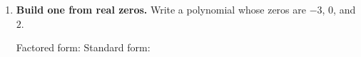 \documentclass[10pt]{article}
\begin{document}
\begin{tcolorbox}[colback=white, colframe=black!40, title=\textbf{Tier R --- Remediate},
    fonttitle=\bfseries, arc=1.5mm, left=3mm, right=3mm, top=2mm, bottom=2mm, breakable]
\begin{enumerate}[leftmargin=1.7em, itemsep=9pt]
    \vspace{2pt}
    Depressed polynomial:  \; Solve it: $x = $ 

    \vspace{2pt}
    Completely factored:  \qquad All solutions: 

    \vspace{2pt}
    Number and type:  real,  imaginary. Total  $=$ degree
    . \checkmark

  \item \textbf{Build one from real zeros.} Write a polynomial whose zeros are $-3$, $0$, and $2$.

    \vspace{2pt}
    Factored form:  \qquad Standard form: 
\end{enumerate}
\end{tcolorbox}
\end{document}

